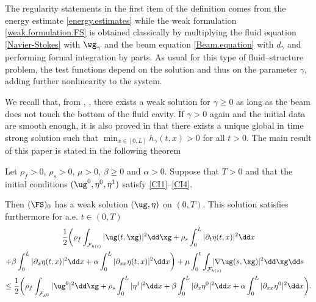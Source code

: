 The regularity statements in the first item of the definition comes from the energy estimate \eqref{energy.estimates} while
the weak formulation \eqref{weak.formulation.FS} is obtained classically by multiplying the fluid equation \eqref{Navier-Stokes}
with $\wg_{\gamma}$ and the beam equation \eqref{Beam.equation} with $d_{\gamma}$ and performing formal integration by parts. As usual for this type of fluid--structure problem, the test functions depend on the solution and thus on the parameter $\gamma$, adding further nonlinearity to the system.

We recall that, from \cite{Chambolle-etal}, \cite{Grandmont08}, there exists a weak solution for $\gamma \geq 0$ as long as the beam does not touch the bottom of the fluid cavity. If $\gamma >0$ again and the initial data are smooth enough, it is also proved in \cite{Grandmont-Hillairet} that there exists a unique global in time strong solution such that $\min_{x\in [0, L]}h_\gamma(t,x)>0$ for all $t>0$. 
The main result of this paper is stated in the following theorem

\begin{theorem}\label{main.theorem}
Let $\rho_{f}>0$, $\rho_{s}>0$, $\mu>0$, $\beta\geq 0$ and $\alpha>0$. Suppose that $T>0$ and that the initial conditions $(\ug^{0},\eta^{0},\eta^{1})$ satisfy \eqref{CI1}--\eqref{CI4}.

Then $(\FS)_0$ has a weak solution $(\ug,\eta)$ on $(0,T)$. This solution satisfies furthermore for a.e. $t \in (0,T)$
\begin{multline}\label{energy.estimates.thm}
\frac{1}{2}\biggl(\rho_{f}\int_{\mathcal{F}_{h(t)}}\vert\ug(t, \xg) \vert^{2} \dd\xg + \rho_{s}\int_{0}^{L}\vert\partial_{t}\eta(t, x) \vert^{2} \dd x\\
\shoveright{+\beta\int_{0}^{L}\vert\partial_{x}\eta(t, x) \vert^{2} \dd x+\alpha\int_{0}^{L}\vert\partial_{xx}\eta(t, x) \vert^{2} \dd x\biggr)
+ \mu\int_0^t\int_{\mathcal{F}_{h(s)}}\hspace*{-5mm}\vert \nabla\ug(s, \xg) \vert^{2} \dd\xg\dd s}\\
\leq \frac{1}{2}\biggl(\rho_{f}\int_{\mathcal{F}_{h^0}}\vert\ug^0\vert^{2} \dd \xg+ \rho_{s}\int_{0}^{L}\vert\eta^1\vert^{2}\dd x
+\beta\int_{0}^{L}\vert\partial_{x}\eta^0\vert^{2}\dd x+\alpha\int_{0}^{L}\vert\partial_{xx}\eta^0\vert^{2}\dd x\biggr).
\end{multline}
\end{theorem}

